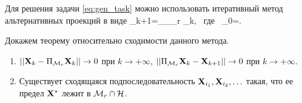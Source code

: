 \documentclass[12pt,a4paper,fleqn,leqno]{article}
\begin{document}
Для решения задачи \eqref{eq:gen_task} можно использовать итеративный метод альтернативных проекций в виде
\be
   \bfY_{k+1}=\Pi_\calH \Pi_{\calM_r} \bfY_{k}, \mbox{\ где\ } \bfY_{0}=\bfX.
\ee

Докажем теорему относительно сходимости данного метода.

\begin{theorem}
\label{th:converg}
\begin{enumerate}
Пусть пространство $\calM_r$ является замкнутым в топологии, порождаемой нормой $\|\cdot\|$. Тогда
\item $||\mathbf{X}_k - \Pi_{\mathcal{M}_r}\mathbf{X}_k|| \to 0$ при $k \to +\infty$, $||\Pi_{\mathcal{M}_r}\mathbf{X}_k - \mathbf{X}_{k+1}|| \to 0$ при $k \to +\infty$.
\item Существует сходящаяся подпоследовательность $\mathbf{X}_{i_1}, \mathbf{X}_{i_2}, \ldots$ такая, что ее предел $\mathbf{X}^*$ лежит в $\mathcal{M}_r \cap \mathcal{H}$.
\end{enumerate}
\end{theorem}
\end{document}
